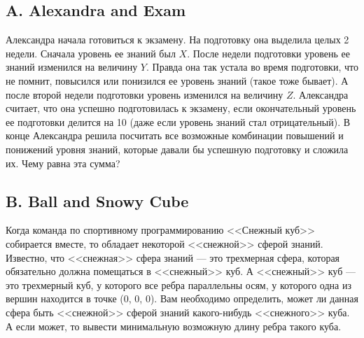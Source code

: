 \subsection*{A. Alexandra and Exam}

Александра начала готовиться к экзамену. На подготовку она выделила целых 2 недели. Сначала уровень ее знаний был $X$. После недели подготовки уровень ее знаний изменился на величину $Y$. Правда она так устала во время подготовки, что не помнит, повысился или понизился ее уровень знаний (такое тоже бывает). А после второй недели подготовки уровень изменился на величину $Z$. Александра считает, что она успешно подготовилась к экзамену, если окончательный уровень ее подготовки делится на 10 (даже если уровень знаний стал отрицательный). В конце Александра решила посчитать все возможные комбинации повышений и понижений уровня знаний, которые давали бы успешную подготовку и сложила их. Чему равна эта сумма? 







\subsection*{B. Ball and Snowy Cube}

Когда команда по спортивному программированию <<Снежный куб>> собирается вместе, то обладает некоторой <<снежной>> сферой знаний. Известно, что <<снежная>> сфера знаний --- это трехмерная сфера, которая обязательно должна помещаться в <<снежный>> куб. А <<снежный>> куб --- это трехмерный куб, у которого все ребра параллельны осям, у которого одна из вершин находится в точке (0, 0, 0). Вам необходимо определить, может ли данная сфера быть <<снежной>> сферой знаний какого-нибудь <<снежного>> куба. А если может, то вывести минимальную возможную длину ребра такого куба.

